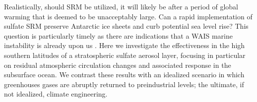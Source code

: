 \documentclass[grl]{AGUTeX}  %
\begin{document}
\begin{article}

Realistically, should SRM be utilized, it will likely be after a period of global warming that is deemed to be unacceptably large. Can a rapid implementation of sulfate SRM preserve Antarctic ice sheets and curb potential sea level rise? This question is particularly timely as there are indications that a WAIS marine instability is already upon us \citep{favier14,rignot14}. Here we investigate the effectiveness in the high southern latitudes of a stratospheric sulfate aerosol layer, focusing in particular on residual atmospheric circulation changes and associated response in the subsurface ocean. We contrast these results with an idealized scenario in which greenhouses gases are abruptly returned to preindustrial levels; the ultimate, if not idealized, climate engineering. 


\end{article}
\end{document}
